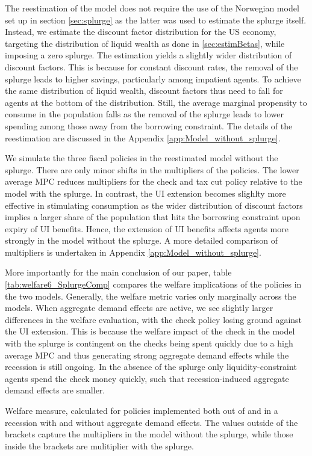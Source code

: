 \documentclass[\econtexRoot/HAFiscal]{subfiles}
\begin{document}
The reestimation of the model does not require the use of the Norwegian model set up in section \ref{sec:splurge} as the latter was used to estimate the splurge itself. Instead, we estimate the discount factor distribution for the US economy, targeting the distribution of liquid wealth as done in \ref{sec:estimBetas}, while imposing a zero splurge. The estimation yields a slightly wider distribution of discount factors. This is because for constant discount rates, the removal of the splurge leads to higher savings, particularly among impatient agents. To achieve the same distribution of liquid wealth, discount factors thus need to fall for agents at the bottom of the distribution. Still, the average marginal propensity to consume in the population falls as the removal of the splurge leads to lower spending among those away from the borrowing constraint. The details of the reestimation are discussed in the Appendix \ref{app:Model_without_splurge}. 

We simulate the three fiscal policies in the reestimated model without the splurge. There are only minor shifts in the multipliers of the policies. The lower average MPC reduces multipliers for the check and tax cut policy relative to the model with the splurge. In contrast, the UI extension becomes slighlty more effective in stimulating consumption as the wider distribution of discount factors implies a larger share of the population that hits the borrowing constraint upon expiry of UI benefits. Hence, the extension of UI benefits affects agents more strongly in the model without the splurge. A more detailed comparison of multipliers is undertaken in Appendix \ref{app:Model_without_splurge}. 

More importantly for the main conclusion of our paper, table \ref{tab:welfare6_SplurgeComp} compares the welfare implications of the policies in the two models. Generally, the welfare metric varies only marginally across the models. When aggregate demand effects are active, we see slightly larger differences in the welfare evaluation, with the check policy losing ground against the UI extension. This is because the welfare impact of the check in the model with the splurge is contingent on the checks being spent quickly due to a high average MPC and thus generating strong aggregate demand effects while the recession is still ongoing. In the absence of the splurge only liquidity-constraint agents spend the check money quickly, such that recession-induced aggregate demand effects are smaller. 

\begin{table}[ht] 
	\center
	
	\caption{Welfare measure, calculated for policies implemented both out of and in a recession with and without aggregate demand effects. The values outside of the brackets capture the multipliers in the model without the splurge, while those inside the brackets are mulitiplier with the splurge.}
	\notinsubfile{\label{tab:welfare6_SplurgeComp}}
\end{table}
\end{document}
